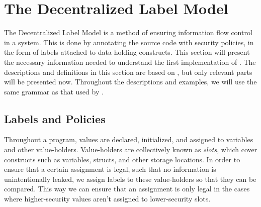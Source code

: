\section{The Decentralized Label Model}
The Decentralized Label Model \cite{myers1997, myers1998, myers2000} is a method of ensuring information flow control in a system.
This is done by annotating the source code with security policies, in the form of labels attached to data-holding constructs.
This section will present the necessary information needed to understand the first implementation of \thetool.
The descriptions and definitions in this section are based on \cite{myers1997, myers1998, myers2000}, but only relevant parts will be presented now.
Throughout the descriptions and examples, we will use the same grammar as that used by \thetool.

\subsection{Labels and Policies}
Throughout a program, values are declared, initialized, and assigned to variables and other value-holders.
Value-holders are collectively known as \emph{slots}, which cover constructs such as variables, structs, and other storage locations.
In order to ensure that a certain assignment is legal, such that no information is unintentionally leaked, we assign labels to these value-holders so that they can be compared.
This way we can ensure that an assignment is only legal in the cases where higher-security values aren't assigned to lower-security slots.
